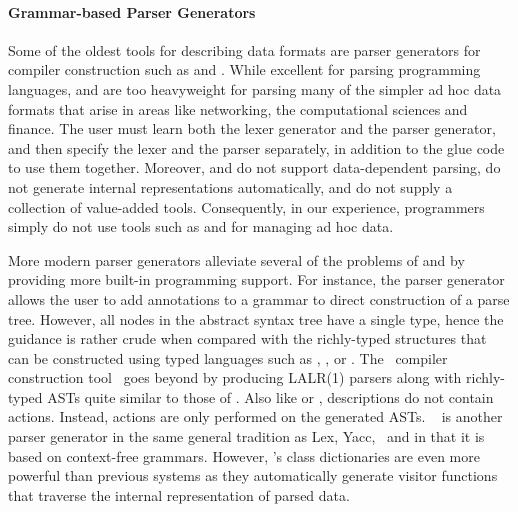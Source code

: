 \paragraph*{Grammar-based Parser Generators}

Some of the oldest tools for describing data formats are parser
generators for compiler construction such as \lex{} and \yacc{}. While
excellent for parsing programming languages, \lex{} and \yacc{} are
too heavyweight for parsing many of the simpler ad hoc data formats
that arise in areas like networking, the computational sciences and
finance. The user must learn both the lexer generator and the parser
generator, and then specify the lexer and the parser separately, in
addition to the glue code to use them together.  Moreover, \lex{}
and \yacc{} do not support data-dependent parsing, do not generate
internal representations automatically, and do not supply a collection
of value-added tools.  Consequently, in our experience,
programmers simply do not use tools such as \lex{} and \yacc{}
for managing ad hoc data.

More modern parser generators alleviate several of the
problems of \lex{} and \yacc{} by providing more built-in programming
support.  For instance, the \antlr{} parser generator~\cite{antlr} allows
the user to add annotations to a grammar to direct construction of a
parse tree. However, all nodes in the abstract syntax tree have a 
single type, hence the guidance is rather crude when compared with
the richly-typed structures that can be constructed using
typed languages such as \padsc{}, \padsml{}, \datascript{} or \ddc. 
The \sablecc\ compiler construction
tool~\cite{sablecc} goes beyond
\antlr{} by producing LALR(1) parsers along with richly-typed ASTs
quite similar to those of \padsc{}. Also like \padsc{} or \padsml{}, 
descriptions
do not contain actions. Instead, actions are only performed on the
generated ASTs. \demeter{}~\cite{lieberherr+:class-dictionaries} is another parser
generator in the same general tradition as Lex, Yacc, \antlr\ and
\sablecc{} in that it is based on context-free grammars.  However,
\demeter{}'s class dictionaries are even more powerful than
previous systems as they
automatically generate visitor functions that traverse the internal
representation of parsed data.

